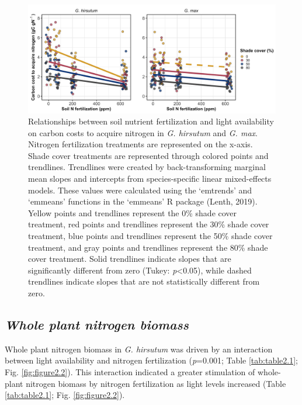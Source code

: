 \newpage
\begin{landscape}
\begin{figure}
    \includegraphics[scale = 1]{ch2_LxN_Greenhouse/figs/fig1_ncost.png}
    \centering
    \caption[Relationships between soil nitrogen fertilization and light availability on carbon costs to acquire nitrogen in \textit{G. hirsutum} and \textit{G. max}]{Relationships between soil nutrient fertilization and light availability on carbon costs to acquire nitrogen in \textit{G. hirsutum} and \textit{G. max}. Nitrogen fertilization treatments are represented on the x-axis. Shade cover treatments are represented through colored points and trendlines. Trendlines were created by back-transforming marginal mean slopes and intercepts from species-specific linear mixed-effects models. These values were calculated using the ‘emtrends’ and ‘emmeans’ functions in the ‘emmeans’ R package (Lenth, 2019). Yellow points and trendlines represent the 0\% shade cover treatment, red points and trendlines represent the 30\% shade cover treatment, blue points and trendlines represent the 50\% shade cover treatment, and gray points and trendlines represent the 80\% shade cover treatment. Solid trendlines indicate slopes that are significantly different from zero (Tukey: \textit{p}<0.05), while dashed trendlines indicate slopes that are not statistically different from zero.}
    \label{fig:figure2.1}
\end{figure}
\end{landscape}
\clearpage

\newpage
\subsection{\textit{Whole plant nitrogen biomass}}
\noindent Whole plant nitrogen biomass in \textit{G. hirsutum} was driven by an interaction between light availability and nitrogen fertilization (\textit{p}=0.001; Table \ref{tab:table2.1}; Fig. \ref{fig:figure2.2}). This interaction indicated a greater stimulation of whole-plant nitrogen biomass by nitrogen fertilization as light levels increased (Table \ref{tab:table2.1}; Fig. \ref{fig:figure2.2}).


